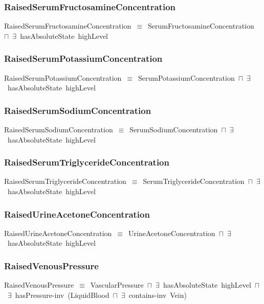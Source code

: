 \documentclass{article}
\begin{document}
\subsubsection*{RaisedSerumFructosamineConcentration}

RaisedSerumFructosamineConcentration~\ensuremath{\equiv}~SerumFructosamineConcentration~\ensuremath{\sqcap}~\ensuremath{\exists}~hasAbsoluteState~highLevel

\subsubsection*{RaisedSerumPotassiumConcentration}

RaisedSerumPotassiumConcentration~\ensuremath{\equiv}~SerumPotassiumConcentration~\ensuremath{\sqcap}~\ensuremath{\exists}~hasAbsoluteState~highLevel

\subsubsection*{RaisedSerumSodiumConcentration}

RaisedSerumSodiumConcentration~\ensuremath{\equiv}~SerumSodiumConcentration~\ensuremath{\sqcap}~\ensuremath{\exists}~hasAbsoluteState~highLevel

\subsubsection*{RaisedSerumTriglycerideConcentration}

RaisedSerumTriglycerideConcentration~\ensuremath{\equiv}~SerumTriglycerideConcentration~\ensuremath{\sqcap}~\ensuremath{\exists}~hasAbsoluteState~highLevel

\subsubsection*{RaisedUrineAcetoneConcentration}

RaisedUrineAcetoneConcentration~\ensuremath{\equiv}~UrineAcetoneConcentration~\ensuremath{\sqcap}~\ensuremath{\exists}~hasAbsoluteState~highLevel

\subsubsection*{RaisedVenousPressure}

RaisedVenousPressure~\ensuremath{\equiv}~VascularPressure~\ensuremath{\sqcap}~\ensuremath{\exists}~hasAbsoluteState~highLevel~\ensuremath{\sqcap}~\ensuremath{\exists}~hasPressure-inv~(LiquidBlood~\ensuremath{\sqcap}~\ensuremath{\exists}~contains-inv~Vein)
\end{document}
